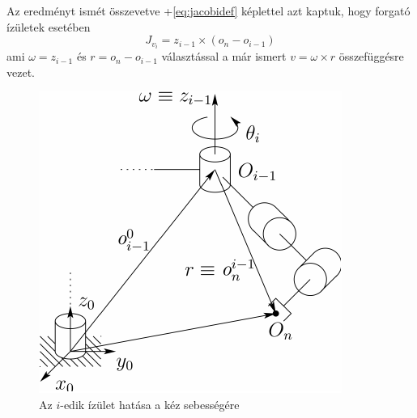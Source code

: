 \documentclass[12pt,a4paper]{report}
\theoremstyle{remark}
\theoremstyle{definition}
\begin{document}
Az eredményt ismét összevetve \az+\eqref{eq:jacobidef} képlettel azt kaptuk, hogy forgató ízületek esetében
\begin{equation}
J_{v_{i}} = z_{i-1} \times (o_{n} - o_{i-1})
\end{equation}
ami $\omega = z_{i-1}$ és $r = o_{n} - o_{i-1}$ választással a már ismert $v = \omega \times r$ összefüggésre vezet.

\begin{figure}[h]
\centering
\includegraphics[width=0.5\linewidth]{./images/Effector_rotation}
\caption{Az $i$-edik ízület hatása a kéz sebességére}
\end{figure}
\end{document}
